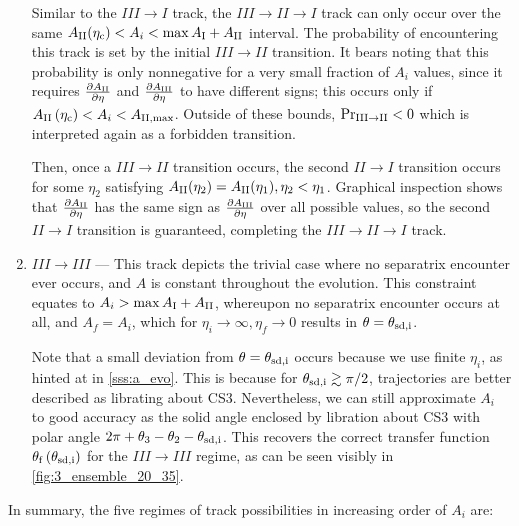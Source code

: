 \documentclass[
        fleqn,
        usenatbib,
        referee,
    ]{mnras}
\newcommand*{\pd}[2]{\frac{\partial#1}{\partial#2}}
\newcommand*{\p}[1]{\left(#1\right)}
\begin{document}
\begin{enumerate}
        Similar to the $III \to I$ track, the $III \to II \to I$ track can only
        occur over the same $A_{\rm II}(\eta_{\rm c}) < A_i < \max A_{\rm I} + A_{\rm
        II}$ interval. The probability of encountering this track is set by the
        initial $III \to II$ transition. It bears noting that this probability
        is only nonnegative for a very small fraction of $A_i$ values, since it
        requires $\pd{A_{\rm II}}{\eta}$ and $\pd{A_{\rm III}}{\eta}$ to have
        different signs; this occurs only if $A_{\rm II}\p{\eta_{\rm c}} < A_i <
        A_{\rm II, \max}$. Outside of these bounds, $\Pr_{\rm III \to II} < 0$
        which is interpreted again as a forbidden transition.

        Then, once a $III \to II$ transition occurs, the second $II \to I$
        transition occurs for some $\eta_2$ satisfying $A_{\rm II}(\eta_2) =
        A_{\rm II}(\eta_1), \eta_2 < \eta_1$. Graphical inspection shows that
        $\pd{A_{\rm II}}{\eta}$ has the same sign as $\pd{A_{\rm III}}{\eta}$
        over all possible values, so the second $II \to I$ transition is
        guaranteed, completing the $III \to II \to I$ track.

    \item $III \to III$ --- This track depicts the trivial case where no
        separatrix encounter ever occurs, and $A$ is constant throughout the
        evolution. This constraint equates to $A_i > \max A_{\rm I} + A_{\rm
        II}$, whereupon no separatrix encounter occurs at all, and $A_f = A_i$,
        which for $\eta_i \to \infty, \eta_f \to 0$ results in $\theta =
        \theta_{\rm sd, i}$.

        Note that a small deviation from $\theta = \theta_{\rm sd, i}$ occurs
        because we use finite $\eta_i$, as hinted at in \autoref{sss:a_evo}.
        This is because for $\theta_{\rm sd, i} \gtrsim \pi/2$, trajectories are
        better described as librating about CS3. Nevertheless, we can still
        approximate $A_i$ to good accuracy as the solid angle enclosed by
        libration about CS3 with polar angle $2\pi + \theta_3 - \theta_2 -
        \theta_{\rm sd, i}$. This recovers the correct transfer function
        $\theta_{\rm f}\p{\theta_{\rm sd, i}}$ for the $III \to III$ regime, as
        can be seen visibly in \autoref{fig:3_ensemble_20_35}.
\end{enumerate}
In summary, the five regimes of track possibilities in increasing order of $A_i$
are:
\end{document}
